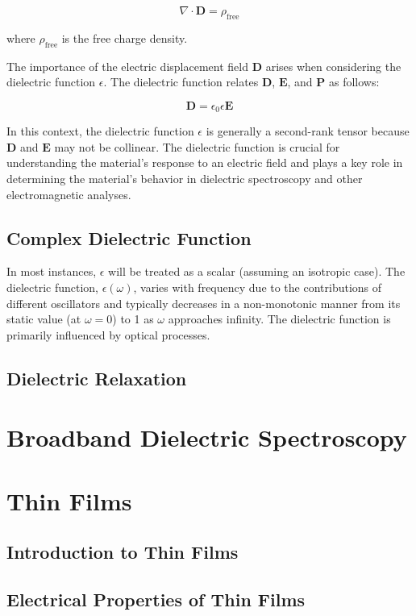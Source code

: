 \[
\nabla \cdot \mathbf{D} = \rho_{\text{free}}
\]

where \( \rho_{\text{free}} \) is the free charge density.

The importance of the electric displacement field \( \mathbf{D} \) arises when considering the dielectric function \( \epsilon \). The dielectric function relates \( \mathbf{D} \), \( \mathbf{E} \), and \( \mathbf{P} \) as follows:

\[
\mathbf{D} = \epsilon_0 \epsilon \mathbf{E}
\]

In this context, the dielectric function \( \epsilon \) is generally a second-rank tensor because \( \mathbf{D} \) and \( \mathbf{E} \) may not be collinear. The dielectric function is crucial for understanding the material's response to an electric field and plays a key role in determining the material's behavior in dielectric spectroscopy and other electromagnetic analyses.

\subsection{Complex Dielectric Function}


In most instances, \( \epsilon \) will be treated as a scalar (assuming an isotropic case). The dielectric function, \( \epsilon(\omega) \), varies with frequency due to the contributions of different oscillators and typically decreases in a non-monotonic manner from its static value (at \( \omega = 0 \)) to 1 as \( \omega \) approaches infinity. The dielectric function is primarily influenced by optical processes.

\subsection{Dielectric Relaxation}
\section{Broadband Dielectric Spectroscopy}
\section{Thin Films}
\subsection{Introduction to Thin Films}
\subsection{Electrical Properties of Thin Films}
